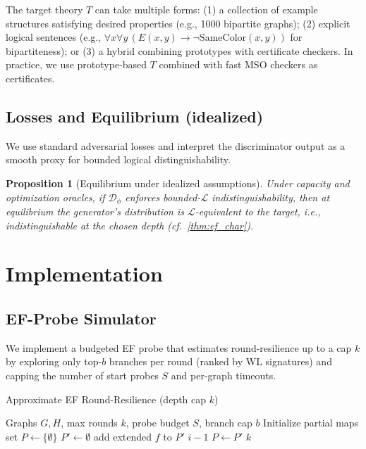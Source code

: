 \documentclass{article}
\newtheorem{proposition}[theorem]{Proposition}
\begin{document}
The target theory $T$ can take multiple forms: (1) a collection of example structures satisfying desired properties (e.g., 1000 bipartite graphs); (2) explicit logical sentences (e.g., $\forall x\forall y\, (E(x,y) \to \neg \text{SameColor}(x,y))$ for bipartiteness); or (3) a hybrid combining prototypes with certificate checkers. In practice, we use prototype-based $T$ combined with fast MSO checkers as certificates.

\subsection{Losses and Equilibrium (idealized)}
We use standard adversarial losses and interpret the discriminator output as a smooth proxy for bounded logical distinguishability.

\begin{proposition}[Equilibrium under idealized assumptions]
\label{prop:equilibrium}
Under capacity and optimization oracles, if $\mathcal{D}_\phi$ enforces bounded-$\mathcal{L}$ indistinguishability, then at equilibrium the generator's distribution is $\mathcal{L}$-equivalent to the target, i.e., indistinguishable at the chosen depth (cf.\ \cref{thm:ef_char}). 
\end{proposition}

\section{Implementation}

\subsection{EF-Probe Simulator}
We implement a budgeted EF probe that estimates round-resilience up to a cap $k$ by exploring only top-$b$ branches per round (ranked by WL signatures) and capping the number of start probes $S$ and per-graph timeouts.

\begin{algorithm}[H]
\caption{Approximate EF Round-Resilience (depth cap $k$)}
\label{alg:ef_distance}
\begin{algorithmic}[1]
\Require Graphs $G,H$, max rounds $k$, probe budget $S$, branch cap $b$
\State Initialize partial maps set $P\gets\{\emptyset\}$
  \State $P' \gets \emptyset$
        \State add extended $f$ to $P'$
      \EndFor
    \EndFor
  \EndFor
   \Return $i-1$ 
  \Else $P\gets P'$
  \EndIf
\EndFor
\Return $k$
\end{algorithmic}
\end{algorithm}
\end{document}
